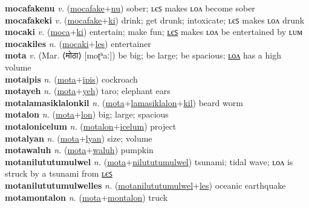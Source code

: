 \textbf{mocafakenu} \textit{v.} (\hyperref[mocafake]{mocafake}+\hyperref[nu]{nu})
sober; ʟєꜱ makes ʟᴏᴧ become sober \label{mocafakenu} \\
\textbf{mocafakeki} \textit{v.} (\hyperref[mocafake]{mocafake}+\hyperref[ki]{ki})
drink; get drunk; intoxicate; ʟєꜱ makes ʟᴏᴧ drunk \label{mocafakeki} \\
\textbf{mocaki} \textit{v.} (\hyperref[moca]{moca}+\hyperref[ki]{ki})
entertain; make fun; \hyperref[mocakiles]{ʟєꜱ} makes ʟᴏᴧ be entertained by ʟᴜᴍ \label{mocaki} \\
\textbf{mocakiles} \textit{n.} (\hyperref[mocaki]{mocaki}+\hyperref[les]{les})
entertainer \label{mocakiles} \\
\textbf{mota} \textit{v.} (Mar. ⟨मोठा⟩ [moʈʰaː])
be big; be large; be spacious; \hyperref[motalon]{ʟᴏᴧ} has a high volume \label{mota} \\
\textbf{motaipis} \textit{n.} (\hyperref[mota]{mota}+\hyperref[ipis]{ipis})
cockroach \label{motaipis} \\
\textbf{motayeh} \textit{n.} (\hyperref[mota]{mota}+\hyperref[yeh]{yeh})
taro; elephant ears \label{motayeh} \\
\textbf{motalamasiklalonkil} \textit{n.} (\hyperref[mota]{mota}+\hyperref[lamasiklalon]{lamasiklalon}+\hyperref[kil]{kil})
beard worm \label{motalamasiklalonkil} \\
\textbf{motalon} \textit{n.} (\hyperref[mota]{mota}+\hyperref[lon]{lon})
big; large; spacious \label{motalon} \\
\textbf{motalonicelum} \textit{n.} (\hyperref[motalon]{motalon}+\hyperref[icelum]{icelum})
project \label{motalonicelum} \\
\textbf{motalyan} \textit{n.} (\hyperref[mota]{mota}+\hyperref[lyan]{lyan})
size; volume \label{motalyan} \\
\textbf{motawaluh} \textit{n.} (\hyperref[mota]{mota}+\hyperref[waluh]{waluh})
pumpkin \label{motawaluh} \\
\textbf{motanilututumulwel} \textit{n.} (\hyperref[mota]{mota}+\hyperref[nilututumulwel]{nilututumulwel})
tsunami; tidal wave; ʟᴏᴧ is struck by a tsunami from \hyperref[motanilututumulwelles]{ʟєꜱ} \label{motanilututumulwel} \\
\textbf{motanilututumulwelles} \textit{n.} (\hyperref[motanilututumulwel]{motanilututumulwel}+\hyperref[les]{les})
oceanic earthquake \label{motanilututumulwelles} \\
\textbf{motamontalon} \textit{n.} (\hyperref[mota]{mota}+\hyperref[montalon]{montalon})
truck \label{motamontalon} \\
